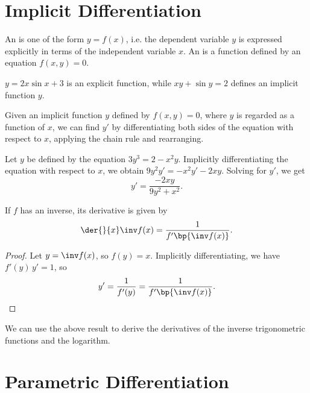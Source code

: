 \section{Implicit Differentiation}

\begin{definition}
    An  is one of the form $y = f(x)$, i.e. the dependent variable $y$ is expressed explicitly in terms of the independent variable $x$. An  is a function defined by an equation $f(x, y) = 0$.
\end{definition}

\begin{example}
    $y = 2x \sin x + 3$ is an explicit function, while $xy + \sin y = 2$ defines an implicit function $y$.
\end{example}

\begin{recipe}
    Given an implicit function $y$ defined by $f(x, y) = 0$, where $y$ is regarded as a function of $x$, we can find $y'$ by differentiating both sides of the equation with respect to $x$, applying the chain rule and rearranging.
\end{recipe}

\begin{example}
    Let $y$ be defined by the equation $3y^3 = 2 - x^2 y$. Implicitly differentiating the equation with respect to $x$, we obtain $9y^2 y' = -x^2 y' - 2x y$. Solving for $y'$, we get \[y' = \frac{-2xy}{9y^2 + x^2}.\]
\end{example}

\begin{proposition}
    If $f$ has an inverse, its derivative is given by \[\der{}{x} \inv f(x) = \frac1{{f'\bp{\inv f(x)}}}.\]
\end{proposition}
\begin{proof}
    Let $y = \inv f(x)$, so $f(y) = x$. Implicitly differentiating, we have $f'(y) \, y' = 1$, so \[y' = \frac1{f'(y)} = \frac1{{f'\bp{\inv f(x)}}}.\]
\end{proof}

We can use the above result to derive the derivatives of the inverse trigonometric functions and the logarithm.

\section{Parametric Differentiation}

